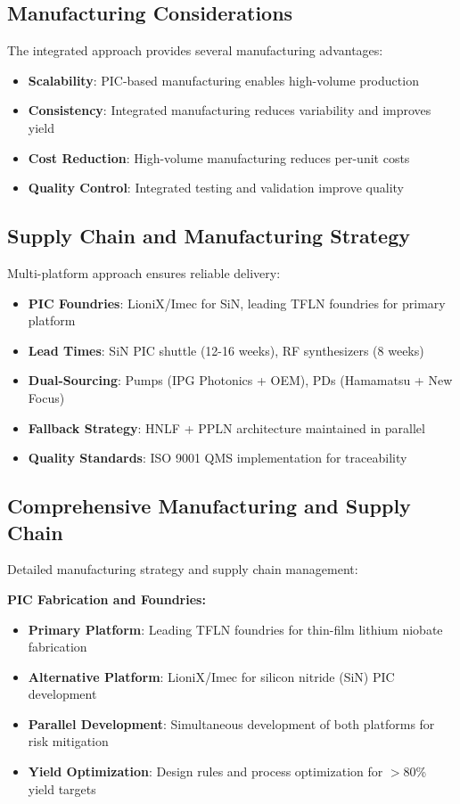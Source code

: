\documentclass[11pt,a4paper]{article}
\begin{document}
\subsection{Manufacturing Considerations}
The integrated approach provides several manufacturing advantages:
\begin{itemize}
\item \textbf{Scalability}: PIC-based manufacturing enables high-volume production
\item \textbf{Consistency}: Integrated manufacturing reduces variability and improves yield
\item \textbf{Cost Reduction}: High-volume manufacturing reduces per-unit costs
\item \textbf{Quality Control}: Integrated testing and validation improve quality
\end{itemize}

\subsection{Supply Chain and Manufacturing Strategy}
Multi-platform approach ensures reliable delivery:
\begin{itemize}
\item \textbf{PIC Foundries}: LioniX/Imec for SiN, leading TFLN foundries for primary platform
\item \textbf{Lead Times}: SiN PIC shuttle (12-16 weeks), RF synthesizers (8 weeks)
\item \textbf{Dual-Sourcing}: Pumps (IPG Photonics + OEM), PDs (Hamamatsu + New Focus)
\item \textbf{Fallback Strategy}: HNLF + PPLN architecture maintained in parallel
\item \textbf{Quality Standards}: ISO 9001 QMS implementation for traceability
\end{itemize}

\subsection{Comprehensive Manufacturing and Supply Chain}
Detailed manufacturing strategy and supply chain management:

\textbf{PIC Fabrication and Foundries:}
\begin{itemize}
\item \textbf{Primary Platform}: Leading TFLN foundries for thin-film lithium niobate fabrication
\item \textbf{Alternative Platform}: LioniX/Imec for silicon nitride (SiN) PIC development
\item \textbf{Parallel Development}: Simultaneous development of both platforms for risk mitigation
\item \textbf{Yield Optimization}: Design rules and process optimization for $>$80\% yield targets
\end{itemize}
\end{document}
